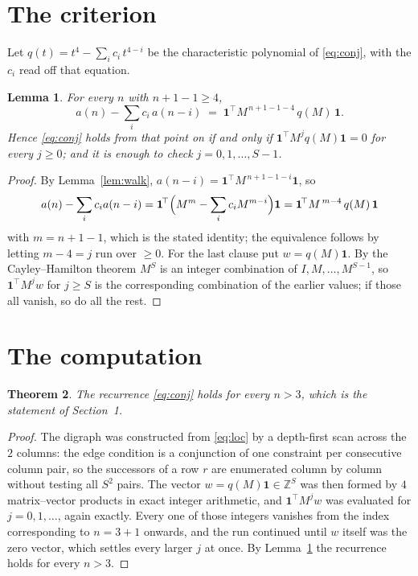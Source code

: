 \documentclass[11pt,a4paper]{article}
\theoremstyle{plain}
\newtheorem{theorem}{Theorem}
\newtheorem{lemma}[theorem]{Lemma}
\theoremstyle{definition}
\begin{document}
\section{The criterion}

Let $q(t)=t^{4}-\sum_i c_i\,t^{4-i}$ be the characteristic polynomial of
\eqref{eq:conj}, with the $c_i$ read off that equation.

\begin{lemma}\label{lem:crit}
For every $n$ with $n+1-1\ge4$,
\[
a(n)-\sum_i c_i\,a(n-i)\;=\;\mathbf{1}^{\!\top}M^{\,n+1-1-4}\,q(M)\,\mathbf{1} .
\]
Hence \eqref{eq:conj} holds from that point on if and only if
$\mathbf{1}^{\!\top}M^{j}q(M)\mathbf{1}=0$ for every $j\ge0$; and it is enough to check
$j=0,1,\dots,S-1$.
\end{lemma}

\begin{proof}
By Lemma~\ref{lem:walk}, $a(n-i)=\mathbf{1}^{\!\top}M^{\,n+1-1-i}\mathbf{1}$, so
\[
a(n)-\sum_i c_i a(n-i)
=\mathbf{1}^{\!\top}\Bigl(M^{m}-\sum_i c_i M^{m-i}\Bigr)\mathbf{1}
=\mathbf{1}^{\!\top}M^{\,m-4}\,q(M)\,\mathbf{1}
\]
with $m=n+1-1$, which is the stated identity; the equivalence follows by letting
$m-4=j$ run over $\ge0$. For the last clause put $w=q(M)\mathbf{1}$. By the
Cayley--Hamilton theorem $M^{S}$ is an integer combination of $I,M,\dots,M^{S-1}$, so
$\mathbf{1}^{\!\top}M^{j}w$ for $j\ge S$ is the corresponding combination of the earlier
values; if those all vanish, so do all the rest.
\end{proof}

\section{The computation}

\begin{theorem}
The recurrence \eqref{eq:conj} holds for every $n>3$, which is the statement of
Section~1.
\end{theorem}

\begin{proof}
The digraph was constructed from \eqref{eq:loc} by a depth-first scan across the $2$
columns: the edge condition is a conjunction of one constraint per consecutive column
pair, so the successors of a row $r$ are enumerated column by column without testing all
$S^2$ pairs. The vector $w=q(M)\mathbf{1}\in\mathbb{Z}^{S}$ was then formed by $4$
matrix--vector products in exact integer arithmetic, and $\mathbf{1}^{\!\top}M^{j}w$ was
evaluated for $j=0,1,\dots$, again exactly. Every one of those integers vanishes from the
index corresponding to $n=3+1$ onwards, and the run continued until $w$ itself was the
zero vector, which settles every larger $j$ at once. By Lemma~\ref{lem:crit} the recurrence
holds for every $n>3$.
\end{proof}
\end{document}
